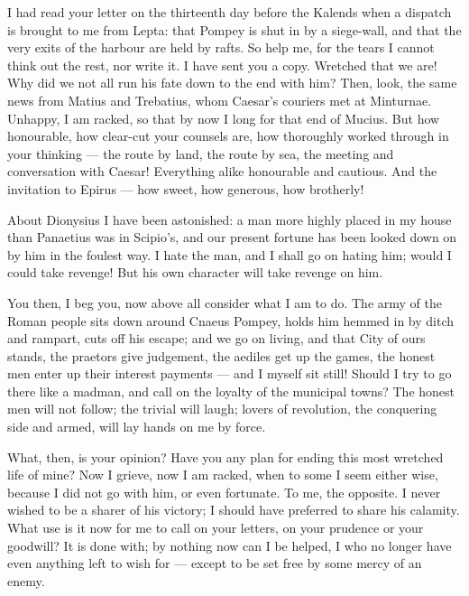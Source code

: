 

 I had read your letter on the thirteenth day before the Kalends when a dispatch is brought to me from Lepta: that Pompey is shut in by a siege-wall, and that the very exits of the harbour are held by rafts. So help me, for the tears I cannot think out the rest, nor write it. I have sent you a copy. Wretched that we are! Why did we not all run his fate down to the end with him? Then, look, the same news from Matius and Trebatius, whom Caesar's couriers met at Minturnae. Unhappy, I am racked, so that by now I long for that end of Mucius. But how honourable, how clear-cut your counsels are, how thoroughly worked through in your thinking --- the route by land, the route by sea, the meeting and conversation with Caesar! Everything alike honourable and cautious. And the invitation to Epirus --- how sweet, how generous, how brotherly!

 About Dionysius I have been astonished: a man more highly placed in my house than Panaetius was in Scipio's, and our present fortune has been looked down on by him in the foulest way. I hate the man, and I shall go on hating him; would I could take revenge! But his own character will take revenge on him.

 You then, I beg you, now above all consider what I am to do. The army of the Roman people sits down around Cnaeus Pompey, holds him hemmed in by ditch and rampart, cuts off his escape; and we go on living, and that City of ours stands, the praetors give judgement, the aediles get up the games, the honest men enter up their interest payments --- and I myself sit still! Should I try to go there like a madman, and call on the loyalty of the municipal towns? The honest men will not follow; the trivial will laugh; lovers of revolution, the conquering side and armed, will lay hands on me by force.

 What, then, is your opinion? Have you any plan for ending this most wretched life of mine? Now I grieve, now I am racked, when to some I seem either wise, because I did not go with him, or even fortunate. To me, the opposite. I never wished to be a sharer of his victory; I should have preferred to share his calamity. What use is it now for me to call on your letters, on your prudence or your goodwill? It is done with; by nothing now can I be helped, I who no longer have even anything left to wish for --- except to be set free by some mercy of an enemy.
